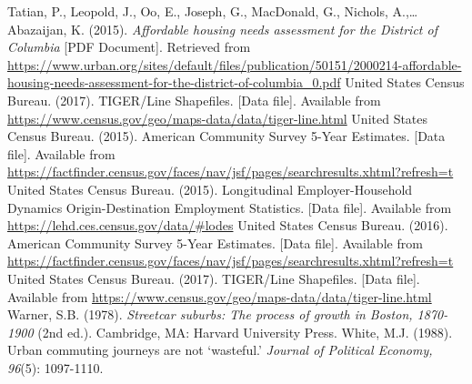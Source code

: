 \documentclass[paper=letter, fontsize=12pt]{scrartcl} %
\begin{document}
\begin{thebibliography}{9}
Tatian, P., Leopold, J., Oo, E., Joseph, G., MacDonald, G., Nichols, A.,\ldots Abazaijan, K. (2015). \textit{Affordable housing needs assessment for the District of Columbia} [PDF Document]. Retrieved from \href{https://www.urban.org/sites/default/files/publication/50151/2000214-affordable-housing-needs-assessment-for-the-district-of-columbia_0.pdf}{https://www.urban.org/sites/default/files/publication/50151/2000214-affordable-housing-needs-assessment-for-the-district-of-columbia\_0.pdf}
United States Census Bureau. (2017). TIGER/Line Shapefiles. [Data file]. Available from \href{https://www.census.gov/geo/maps-data/data/tiger-line.html}{https://www.census.gov/geo/maps-data/data/tiger-line.html}
United States Census Bureau. (2015). American Community Survey 5-Year Estimates. [Data file]. Available from \href{https://factfinder.census.gov/faces/nav/jsf/pages/searchresults.xhtml?refresh=t}{https://factfinder.census.gov/faces/nav/jsf/pages/searchresults.xhtml?refresh=t}
United States Census Bureau. (2015). Longitudinal Employer-Household Dynamics Origin-Destination Employment Statistics. [Data file]. Available from \href{https://lehd.ces.census.gov/data/\#lodes}{https://lehd.ces.census.gov/data/\#lodes}
United States Census Bureau. (2016). American Community Survey 5-Year Estimates. [Data file]. Available from \href{https://factfinder.census.gov/faces/nav/jsf/pages/searchresults.xhtml?refresh=t}{https://factfinder.census.gov/faces/nav/jsf/pages/searchresults.xhtml?refresh=t}
United States Census Bureau. (2017). TIGER/Line Shapefiles. [Data file]. Available from \href{https://www.census.gov/geo/maps-data/data/tiger-line.html}{https://www.census.gov/geo/maps-data/data/tiger-line.html}
Warner, S.B. (1978). \textit{Streetcar suburbs: The process of growth in Boston, 1870-1900} (2nd ed.). Cambridge, MA: Harvard University Press.
White, M.J. (1988). Urban commuting journeys are not `wasteful.' \textit{Journal of Political Economy, 96}(5): 1097-1110.
\end{thebibliography}
\end{document}
